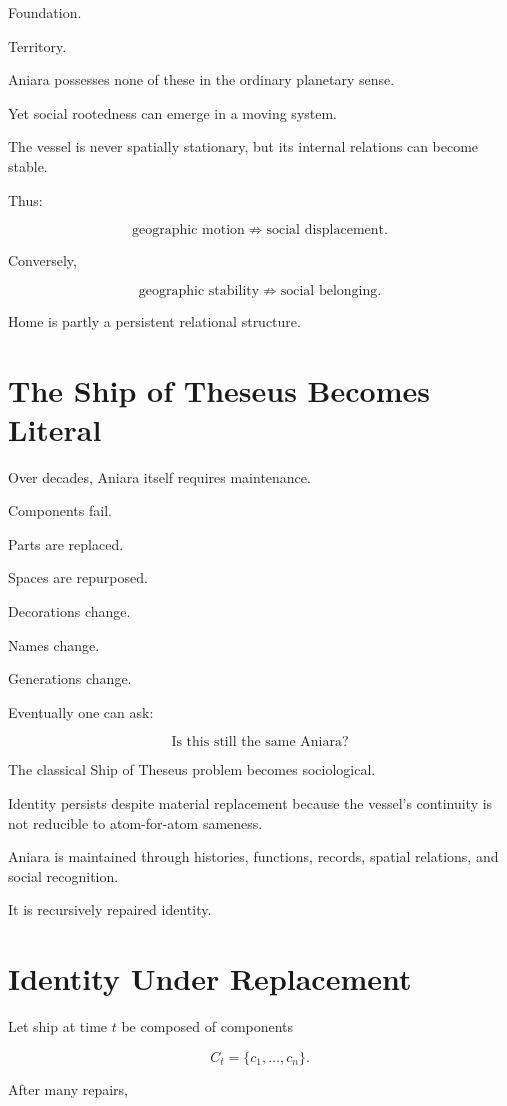 \documentclass[11pt,oneside]{book}
\theoremstyle{definition}
\theoremstyle{remark}
\begin{document}
Foundation.

Territory.

Aniara possesses none of these in the ordinary planetary sense.

Yet social rootedness can emerge in a moving system.

The vessel is never spatially stationary, but its internal relations can become stable.

Thus:

\[
\text{geographic motion}
\not\Rightarrow
\text{social displacement}.
\]

Conversely,

\[
\text{geographic stability}
\not\Rightarrow
\text{social belonging}.
\]

Home is partly a persistent relational structure.

\section{The Ship of Theseus Becomes Literal}

Over decades, Aniara itself requires maintenance.

Components fail.

Parts are replaced.

Spaces are repurposed.

Decorations change.

Names change.

Generations change.

Eventually one can ask:

\[
\text{Is this still the same Aniara?}
\]

The classical Ship of Theseus problem becomes sociological.

Identity persists despite material replacement because the vessel's continuity is not reducible to atom-for-atom sameness.

Aniara is maintained through histories, functions, records, spatial relations, and social recognition.

It is recursively repaired identity.

\section{Identity Under Replacement}

Let ship at time \(t\) be composed of components

\[
C_t=\{c_1,\ldots,c_n\}.
\]

After many repairs,
\end{document}
